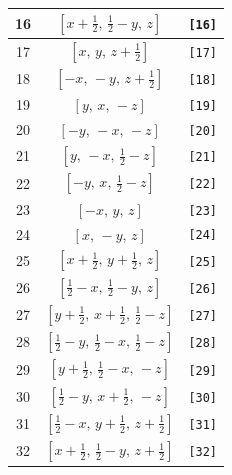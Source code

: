 \documentclass[fleqn,8pt]{jsarticle}
\begin{document}
\begin{longtable}{ccc}
16 & $\left[ x + \frac{1}{2},\, \frac{1}{2} - y,\, z \right]$ & {\tt [16]} \\ \hline
17 & $\left[ x,\, y,\, z + \frac{1}{2} \right]$ & {\tt [17]} \\ \hline
18 & $\left[ - x,\, - y,\, z + \frac{1}{2} \right]$ & {\tt [18]} \\ \hline
19 & $\left[ y,\, x,\, - z \right]$ & {\tt [19]} \\ \hline
20 & $\left[ - y,\, - x,\, - z \right]$ & {\tt [20]} \\ \hline
21 & $\left[ y,\, - x,\, \frac{1}{2} - z \right]$ & {\tt [21]} \\ \hline
22 & $\left[ - y,\, x,\, \frac{1}{2} - z \right]$ & {\tt [22]} \\ \hline
23 & $\left[ - x,\, y,\, z \right]$ & {\tt [23]} \\ \hline
24 & $\left[ x,\, - y,\, z \right]$ & {\tt [24]} \\ \hline
25 & $\left[ x + \frac{1}{2},\, y + \frac{1}{2},\, z \right]$ & {\tt [25]} \\ \hline
26 & $\left[ \frac{1}{2} - x,\, \frac{1}{2} - y,\, z \right]$ & {\tt [26]} \\ \hline
27 & $\left[ y + \frac{1}{2},\, x + \frac{1}{2},\, \frac{1}{2} - z \right]$ & {\tt [27]} \\ \hline
28 & $\left[ \frac{1}{2} - y,\, \frac{1}{2} - x,\, \frac{1}{2} - z \right]$ & {\tt [28]} \\ \hline
29 & $\left[ y + \frac{1}{2},\, \frac{1}{2} - x,\, - z \right]$ & {\tt [29]} \\ \hline
30 & $\left[ \frac{1}{2} - y,\, x + \frac{1}{2},\, - z \right]$ & {\tt [30]} \\ \hline
31 & $\left[ \frac{1}{2} - x,\, y + \frac{1}{2},\, z + \frac{1}{2} \right]$ & {\tt [31]} \\ \hline
32 & $\left[ x + \frac{1}{2},\, \frac{1}{2} - y,\, z + \frac{1}{2} \right]$ & {\tt [32]} \\
\end{longtable}
\end{document}
